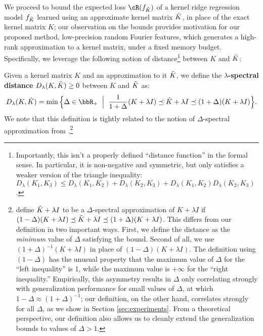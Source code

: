We proceed to bound the expected loss $\cR(f_{\tK})$ of a kernel ridge regression model $f_{\tilde{K}}$ learned using an approximate kernel matrix $\tilde{K}$, in place of the exact kernel matrix $K$; our observation on the bounds provides motivation for our proposed method, low-precision random Fourier features, which generates a high-rank approximation to a kernel matrix, under a fixed memory budget.
Specifically, we leverage the following notion of distance\footnote{Importantly, this isn't a properly defined ``distance function'' in the formal sense.  In particular, it is non-negative and symmetric, but only satisfies a weaker version of the triangle inequality: $D_{\lambda}(K_1,K_3) \leq D_{\lambda}(K_1,K_2) + D_{\lambda}(K_2,K_3) + D_{\lambda}(K_1,K_2)D_{\lambda}(K_2,K_3)$.} between $K$ and $\tilde{K}$:

\begin{definition}
	Given a kernel matrix $K$ and an approximation to it $\tilde{K}$, we define the \textbf{$\lambda$-spectral distance} $D_{\lambda}(K,\tilde{K})\geq 0$ between $K$ and $\tilde{K}$ as:
	$$D_{\lambda}(K,\tK) = \min \Big\{\Delta \in \RR_{+} \;\;\Big|\;\; \frac{1}{1+\Delta}(K+\lambda I) \preceq \tK + \lambda I \preceq (1+\Delta)(K+\lambda I)\Big\}.$$
	We note that this definition is tightly related to the notion of $\Delta$-spectral approximation from \citet{avron17}.\footnote{\citet{avron17} define $\tilde{K}+\lambda I$ to be a $\Delta$-spectral approximation of $K+\lambda I$ if $(1-\Delta)(K+\lambda I) \preceq \tilde{K} + \lambda I \preceq (1+\Delta)(K+\lambda I)$. This differs from our definition in two important ways. First, we define the distance as the \textit{minimum} value of $\Delta$ satisfying the bound.  Second of all, we use $(1+\Delta)^{-1}(K+\lambda I)$ in place of $(1-\Delta)(K+\lambda I)$. The definition using $(1-\Delta)$ has the unusual property that the maximum value of $\Delta$ for the ``left inequality'' is 1, while the maximum value is $+\infty$ for the ``right inequality.'' Empirically, this asymmetry results in $\Delta$ only correlating strongly with generalization performance for small values of $\Delta$, at which $1-\Delta\approx (1+\Delta)^{-1}$; our definition, on the other hand, correlates strongly for all $\Delta$, as we show in Section \ref{sec:experiments}.  From a theoretical perspective, our definition also allows us to cleanly extend the generalization bounds to values of $\Delta > 1$.}
\end{definition}

